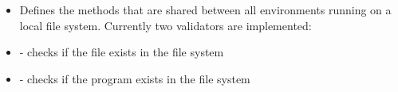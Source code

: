 \begin{itemize}[label={}]
    \item Defines the methods that are shared between all environments running on a local file system.
          Currently two validators are implemented:
    \item {} - checks if the file exists in the file system
    \item {} - checks if the program exists in the file system
\end{itemize}
